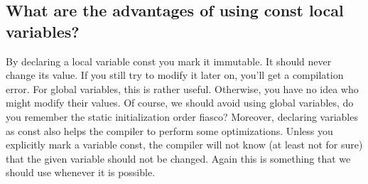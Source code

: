 \documentclass{report}
\begin{document}
\pagebreak 
{}
\bigbreak \noindent 
\subsection{What are the advantages of using const local variables?}
\bigbreak \noindent 
By declaring a local variable const you mark it immutable. It should
never change its value. If you still try to modify it later on, you’ll
get a compilation error. For global variables, this is rather useful.
Otherwise, you have no idea who might modify their values. Of
course, we should avoid using global variables, do you remember
the static initialization order fiasco?
\bigbreak \noindent 
Moreover, declaring variables as const also helps the compiler to
perform some optimizations. Unless you explicitly mark a variable
const, the compiler will not know (at least not for sure) that the
given variable should not be changed. Again this is something that
we should use whenever it is possible.

\bigbreak \noindent 
\end{document}
